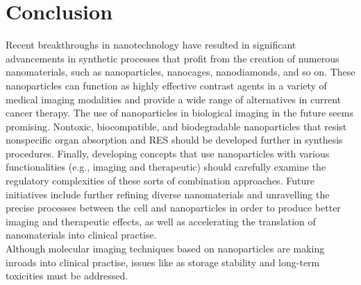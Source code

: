 \documentclass[12pt]{article}
\begin{document}
\section*{Conclusion}
Recent breakthroughs in nanotechnology have resulted in significant advancements in synthetic processes that profit from the creation of numerous nanomaterials, such as nanoparticles, nanocages, nanodiamonds, and so on. These nanoparticles can function as highly effective contrast agents in a variety of medical imaging modalities and provide a wide range of alternatives in current cancer therapy. The use of nanoparticles in biological imaging in the future seems promising. Nontoxic, biocompatible, and biodegradable nanoparticles that resist nonspecific organ absorption and RES should be developed further in synthesis procedures. Finally, developing concepts that use nanoparticles with various functionalities (e.g., imaging and therapeutic) should carefully examine the regulatory complexities of these sorts of combination approaches.
Future initiatives include further refining diverse nanomaterials and unravelling the precise processes between the cell and nanoparticles in order to produce better imaging and therapeutic effects, as well as accelerating the translation of nanomaterials into clinical practise. \\Although molecular imaging techniques based on nanoparticles are making inroads into clinical practise, issues like as storage stability and long-term toxicities must be addressed. 
\end{document}
